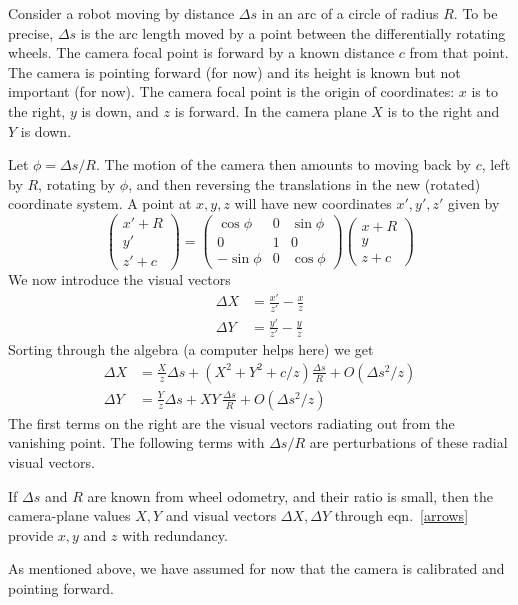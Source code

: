\documentclass[12pt]{article}
\begin{document}
\noindent Consider a robot moving by distance $\Delta s$ in an arc of a
circle of radius $R$.  To be precise, $\Delta s$ is the arc length
moved by a point between the differentially rotating wheels.
The camera focal point is forward by a known distance $c$ from that
point.  The camera is pointing forward (for now) and its height is
known but not important (for now).  The camera focal point is the
origin of coordinates: $x$ is to the right, $y$ is down, and $z$ is
forward.  In the camera plane $X$ is to the right and $Y$ is down.

Let $\phi=\Delta s/R$.  The motion of the camera then amounts to
moving back by $c$, left by $R$, rotating by $\phi$, and then
reversing the translations in the new (rotated) coordinate system.  A
point at $x,y,z$ will have new coordinates $x',y',z'$ given by
\begin{equation}
  \begin{pmatrix} x' + R \\ y' \\ z' + c \end{pmatrix} =
  \begin{pmatrix}
    \cos\phi & 0 & \sin\phi \\
    0        & 1 & 0 \\
   -\sin\phi & 0 & \cos\phi
  \end{pmatrix}
  \begin{pmatrix} x  + R \\ y \\ z  + c \end{pmatrix}
\end{equation}
We now introduce the visual vectors
\begin{equation}
\begin{aligned}
  \Delta X &= \frac{x'}{z'}-\frac xz \\
  \Delta Y &= \frac{y'}{z'}-\frac yz
\end{aligned}
\end{equation}
Sorting through the algebra (a computer helps here) we get
\begin{equation}\label{arrows}
\begin{aligned}
  \Delta X &= \frac Xz \Delta s + (X^2+Y^2 + c/z) \frac{\Delta s}R
  + O\left(\Delta s^2/z\right) \\
  \Delta Y &= \frac Yz \Delta s + XY \,\frac{\Delta s}R
  + O\left(\Delta s^2/z\right)
\end{aligned}
\end{equation}
The first terms on the right are the visual vectors radiating out from
the vanishing point.  The following terms with $\Delta s/R$ are
perturbations of these radial visual vectors.

If $\Delta s$ and $R$ are known from wheel odometry, and their ratio
is small, then the camera-plane values $X,Y$ and visual vectors
$\Delta X,\Delta Y$ through eqn.~\eqref{arrows} provide $x,y$ and $z$
with redundancy.

As mentioned above, we have assumed for now that the camera is
calibrated and pointing forward.
\end{document}
